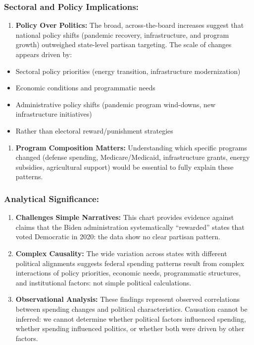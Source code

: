 \documentclass[
  11pt,
]{article}
\providecommand{\tightlist}{%
  \setlength{\itemsep}{0pt}\setlength{\parskip}{0pt}}
\begin{document}
\subsubsection{Sectoral and Policy
Implications:}\label{sectoral-and-policy-implications}

\begin{enumerate}
\def\labelenumi{\arabic{enumi}.}
\tightlist
\item
  \textbf{Policy Over Politics:} The broad, across-the-board increases
  suggest that national policy shifts (pandemic recovery,
  infrastructure, and program growth) outweighed state-level partisan
  targeting. The scale of changes appears driven by:
\end{enumerate}

\begin{itemize}
\tightlist
\item
  Sectoral policy priorities (energy transition, infrastructure
  modernization)
\item
  Economic conditions and programmatic needs
\item
  Administrative policy shifts (pandemic program wind-downs, new
  infrastructure initiatives)
\item
  Rather than electoral reward/punishment strategies
\end{itemize}

\begin{enumerate}
\def\labelenumi{\arabic{enumi}.}
\setcounter{enumi}{2}
\tightlist
\item
  \textbf{Program Composition Matters:} Understanding which specific
  programs changed (defense spending, Medicare/Medicaid, infrastructure
  grants, energy subsidies, agricultural support) would be essential to
  fully explain these patterns.
\end{enumerate}

\subsubsection{Analytical Significance:}\label{analytical-significance}

\begin{enumerate}
\def\labelenumi{\arabic{enumi}.}
\item
  \textbf{Challenges Simple Narratives:} This chart provides evidence
  against claims that the Biden administration systematically
  ``rewarded'' states that voted Democratic in 2020: the data show no
  clear partisan pattern.
\item
  \textbf{Complex Causality:} The wide variation across states with
  different political alignments suggests federal spending patterns
  result from complex interactions of policy priorities, economic needs,
  programmatic structures, and institutional factors: not simple
  political calculations.
\item
  \textbf{Observational Analysis:} These findings represent observed
  correlations between spending changes and political characteristics.
  Causation cannot be inferred: we cannot determine whether political
  factors influenced spending, whether spending influenced politics, or
  whether both were driven by other factors.
\end{enumerate}
\end{document}
